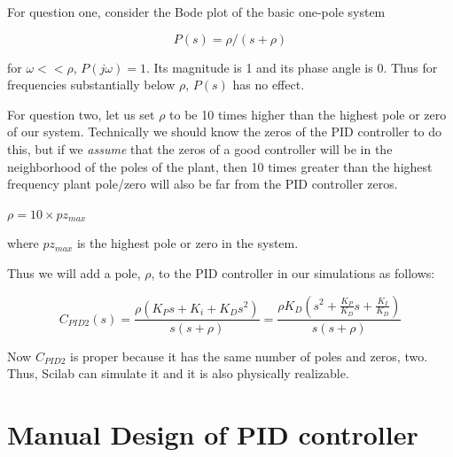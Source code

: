 
For question one, consider the Bode plot of the basic one-pole system	%


\[
P(s) = \rho/(s+\rho)
\]

for $\omega << \rho$, $P(j\omega) = 1$.  Its magnitude is 1 and its phase angle is 0.
Thus for frequencies substantially below $\rho$, $P(s)$ has no effect.	%






For question two, let us set $\rho$ to be 10 times higher than the highest pole or zero of our system.   Technically we should know the zeros of the PID controller to do this, but if we {\it assume} that the zeros of a good controller will be in the neighborhood of the poles of the plant, then 10 times greater than the highest frequency plant pole/zero will also be far from the PID controller zeros.	%

$\rho = 10\times pz_{max}$	%

where $pz_{max}$ is the highest pole or zero in the system.	%

Thus we will add a pole, $\rho$,  to the PID controller in our simulations as follows:	%

\[
C_{PID2}(s) = \frac{\rho(K_Ps+K_i + K_Ds^2)}{s(s+\rho)} = \frac{\rho K_D(s^2 + \frac{K_P}{K_D}s + \frac{K_I}{K_D})}{s(s+\rho)}
\]

Now $C_{PID2}$ is proper
because it has the same number of poles and zeros, two.  Thus, Scilab can simulate it and it is also physically realizable.	%









\section{Manual Design of PID controller}\label{manualPIDdesign}

